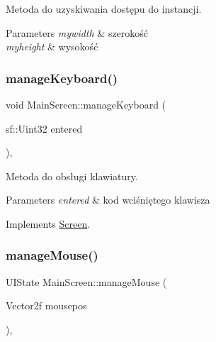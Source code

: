 Metoda do uzyskiwania dostępu do instancji. 


\begin{DoxyParams}{Parameters}
{\em mywidth} & szerokość \\
\hline
{\em myheight} & wysokość \\
\hline
\end{DoxyParams}
\mbox{\label{class_main_screen_ac0e2f8d06e1a7fef07d52730b94132d3}} 
\subsubsection{\texorpdfstring{manageKeyboard()}{manageKeyboard()}}
{\footnotesize\ttfamily void Main\+Screen\+::manage\+Keyboard (\begin{DoxyParamCaption}\item[{sf\+::\+Uint32}]{entered }\end{DoxyParamCaption})\hspace{0.3cm}{\ttfamily [override]}, {\ttfamily [virtual]}}



Metoda do obsługi klawiatury. 


\begin{DoxyParams}{Parameters}
{\em entered} & kod wciśniętego klawisza \\
\hline
\end{DoxyParams}


Implements \mbox{\hyperlink{class_screen_a5b385381d2ba942567f4317e916c9951}{Screen}}.

\mbox{\label{class_main_screen_a767f261da366524c32b687b4cce0e85c}} 
\subsubsection{\texorpdfstring{manageMouse()}{manageMouse()}}
{\footnotesize\ttfamily U\+I\+State Main\+Screen\+::manage\+Mouse (\begin{DoxyParamCaption}\item[{Vector2f}]{mousepos }\end{DoxyParamCaption})\hspace{0.3cm}{\ttfamily [override]}, {\ttfamily [virtual]}}



